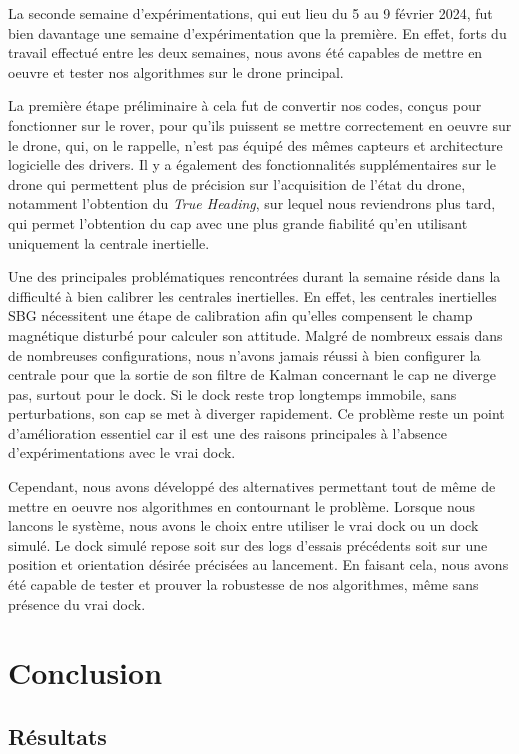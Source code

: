 \documentclass[12pt]{report}
\begin{document}
La seconde semaine d'expérimentations, qui eut lieu du 5 au 9 février 2024, fut bien davantage une semaine d'expérimentation que la première. 
En effet, forts du travail effectué entre les deux semaines, nous avons été capables de mettre en oeuvre et tester nos algorithmes sur le drone principal.

La première étape préliminaire à cela fut de convertir nos codes, conçus pour fonctionner sur le rover, pour qu'ils puissent se mettre correctement en oeuvre sur le drone, qui, on le rappelle, n'est pas
équipé des mêmes capteurs et architecture logicielle des drivers. Il y a également des fonctionnalités supplémentaires sur le drone qui permettent plus de précision sur l'acquisition de l'état du drone, notamment 
l'obtention du \textit{True Heading}, sur lequel nous reviendrons plus tard, qui permet l'obtention du cap avec une plus grande fiabilité qu'en utilisant uniquement la centrale inertielle. 

Une des principales problématiques rencontrées durant la semaine réside dans la difficulté à bien calibrer les centrales inertielles. En effet, les centrales inertielles SBG nécessitent une étape de calibration
afin qu'elles compensent le champ magnétique disturbé pour calculer son attitude. Malgré de nombreux essais dans de nombreuses configurations, nous n'avons jamais réussi à bien configurer la centrale 
pour que la sortie de son filtre de Kalman concernant le cap ne diverge pas, surtout pour le dock. Si le dock reste trop longtemps immobile, sans perturbations, son cap se met à diverger rapidement.
Ce problème reste un point d'amélioration essentiel car il est une des raisons principales à l'absence d'expérimentations avec le vrai dock. 

Cependant, nous avons développé des alternatives permettant tout de même de mettre en oeuvre nos algorithmes en contournant le problème. Lorsque nous lancons le système, nous avons le choix entre
utiliser le vrai dock ou un dock simulé. Le dock simulé repose soit sur des logs d'essais précédents soit sur une position et orientation désirée précisées au lancement. 
En faisant cela, nous avons été capable de tester et prouver la robustesse de nos algorithmes, même sans présence du vrai dock.



\chapter{Conclusion}
\section{Résultats}
\end{document}
